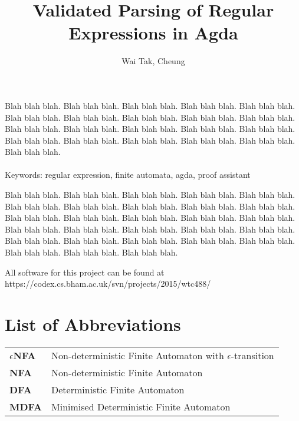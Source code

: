 \documentclass[twoside,openright,final]{bhamthesis}
\title{\textbf{Validated Parsing of Regular Expressions in Agda}}
\author{Wai Tak, Cheung}
\begin{document}
\maketitle

\abstract
\par Blah blah blah. Blah blah blah. Blah blah blah. Blah blah blah. Blah
blah blah. Blah blah blah. Blah blah blah. Blah blah blah.
Blah blah blah. Blah blah blah. Blah blah blah. Blah blah blah. Blah
blah blah.
Blah blah blah. Blah blah blah. Blah blah blah. Blah blah blah.
Blah blah blah. Blah blah blah. Blah blah blah. Blah blah blah. \\ \\
Keywords: regular expression, finite automata, agda, proof assistant

\acknowledgments
\par Blah blah blah. Blah blah blah. Blah blah blah. Blah blah blah. Blah
blah blah. Blah blah blah. Blah blah blah.
Blah blah blah. Blah blah blah. Blah blah blah.
Blah blah blah. Blah blah blah. Blah blah blah. Blah blah blah. Blah
blah blah. Blah blah blah. Blah blah blah.
Blah blah blah. Blah blah blah. Blah blah blah. Blah blah blah. Blah
blah blah. Blah blah blah.
Blah blah blah. Blah blah blah. Blah blah blah. Blah blah blah. Blah
blah blah.

\repository
\vspace{7cm}
\begin{center}
  All software for this project can be found at \\
  https://codex.cs.bham.ac.uk/svn/projects/2015/wtc488/
\end{center}

\newpage
\section*{List of Abbreviations}
\begin{tabular}{ll}
  \textbf{\(\epsilon\)NFA} & Non-deterministic Finite Automaton with
                              \(\epsilon\)-transition \\
  \textbf{NFA} & Non-deterministic Finite Automaton \\
  \textbf{DFA} & Deterministic Finite Automaton \\
  \textbf{MDFA} & Minimised Deterministic Finite Automaton
\end{tabular}
\newpage

\newpage
\setcounter{tocdepth}{3}
\tableofcontents
\end{document}
